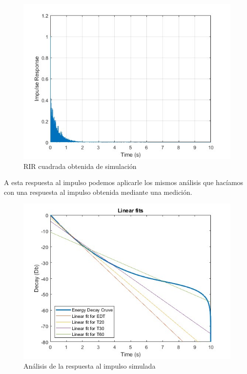 \begin{figure}[!htb]
    \centering
    \includegraphics[width=\linewidth]{imagenes/RIRsquared_Simulated.jpg}
    \caption{\footnotesize RIR cuadrada obtenida de simulación}
    \label{fig:RIRsqSimulated}
\end{figure}
\FloatBarrier
A esta respuesta al impulso podemos aplicarle los mismos análisis que hacíamos con una respuesta al impulso obtenida mediante una medición.
\begin{figure}[!htb]
    \centering
    \includegraphics[width=\linewidth]{imagenes/RIRSimulated_Analysis.jpg}
    \caption{\footnotesize Análisis de la respuesta al impulso simulada}
    \label{fig:RIRSimulated_Analysis}
\end{figure}
